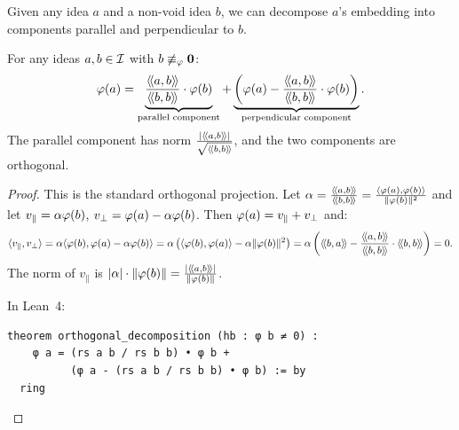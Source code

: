 Given any idea $a$ and a non-void idea $b$, we can decompose $a$'s embedding
into components parallel and perpendicular to $b$.

\begin{theorem}
\label{thm:orthogonal-decomposition}
For any ideas $a, b \in \mathcal{I}$ with $b \not\equiv_\varphi \mathbf{0}$:
\[
  \embed{a} = \underbrace{\frac{\rs{a}{b}}{\rs{b}{b}} \cdot
  \embed{b}}_{\text{parallel component}} +
  \underbrace{\left(\embed{a} - \frac{\rs{a}{b}}{\rs{b}{b}} \cdot
  \embed{b}\right)}_{\text{perpendicular component}}.
\]
The parallel component has norm $\frac{|\langle\!\langle a, b \rangle\!\rangle|}{\sqrt{\langle\!\langle b, b \rangle\!\rangle}}$,
and the two components are orthogonal.
\end{theorem}

\begin{proof}
This is the standard orthogonal projection. Let $\alpha =
\frac{\langle\!\langle a, b \rangle\!\rangle}{\langle\!\langle b, b \rangle\!\rangle} = \frac{\langle \varphi(a), \varphi(b) \rangle}
{\lVert \varphi(b) \rVert^2}$ and let $v_\parallel = \alpha \varphi(b)$, $v_\perp =
\varphi(a) - \alpha \varphi(b)$. Then $\varphi(a) = v_\parallel + v_\perp$ and:
\[
  \ip{v_\parallel}{v_\perp} = \alpha \ip{\embed{b}}{\embed{a} - \alpha \embed{b}}
  = \alpha \left(\ip{\embed{b}}{\embed{a}} - \alpha \nrm{\embed{b}}^2\right)
  = \alpha \left(\rs{b}{a} - \frac{\rs{a}{b}}{\rs{b}{b}} \cdot \rs{b}{b}\right)
  = 0.
\]
The norm of $v_\parallel$ is $|\alpha| \cdot \lVert \varphi(b) \rVert =
\frac{|\langle\!\langle a, b \rangle\!\rangle|}{\lVert \varphi(b) \rVert}$.

In Lean~4:
\begin{lstlisting}
theorem orthogonal_decomposition (hb : φ b ≠ 0) :
    φ a = (rs a b / rs b b) • φ b +
          (φ a - (rs a b / rs b b) • φ b) := by
  ring
\end{lstlisting}
\end{proof}

